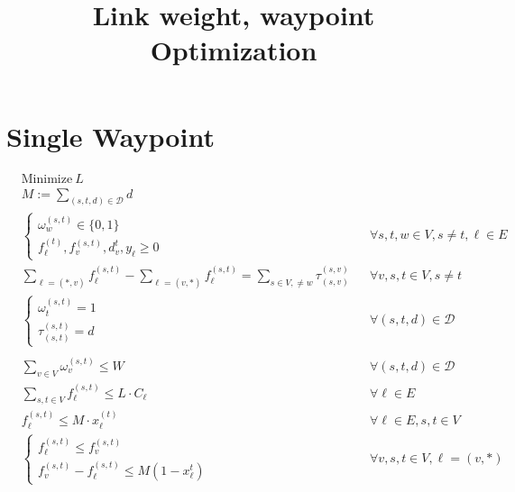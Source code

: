\documentclass[a4paper,USenglish]{lipics-v2018}
\title{Link weight, waypoint Optimization}
\begin{document}
\maketitle

\section{Single Waypoint}

\begin{align}
& \text{Minimize} ~L \nonumber	&&\\
&M := \sum_{ (s,t,d) \in \mathcal{D}} d &&
\\
&\begin{cases}
\omega^{(s,t)}_{w} \in \{0,1\} \\
f^{(t)}_{\ell}, f^{(s,t)}_{v}, d^{t}_v, y_{\ell}  \geq 0
\end{cases}
&&\forall  s,t,w \in V, s \neq t, \ell \in E \label{LP:vardef}    
\\
&\sum_{\ell = (*,v)} f^{(s,t)}_{\ell} - 
	\sum_{\ell= (v,*)}f^{(s,t)}_{\ell}
	= \sum_{ s\in V,\neq w} \tau^{(s,v)}_{(s,v)}
&& \forall v,s,t \in V, s \neq t
\label{LP:flowcons}
\\
& 
\begin{cases}
\omega^{(s,t)}_{t} = 1 \\
\tau^{(s,t)}_{(s,t)} = d
\end{cases}
&& \forall (s,t,d) \in \mathcal{D}
\label{LP:wp_t}
\\
&
\\
&\sum_{v \in V}  \omega^{(s,t)}_v \leq W
&& \forall (s,t,d) \in \mathcal{D}
\label{LP:wp_limit} 
\\
& \sum_{ s,t \in V} f^{(s,t)}_{\ell} \leq L \cdot C_{\ell}
&& \forall \ell \in E
\\
&   f^{(s,t)}_{\ell} \leq M \cdot x^{(t)}_{\ell}
&& \forall \ell \in E, s,t \in V
\label{LP:SPTree} 
\\
&
\begin{cases*}
f^{(s,t)}_{\ell} \leq f^{(s,t)}_{v}	\\
f^{(s,t)}_{v} - f^{(s,t)}_{\ell} \leq M(1 - x^{t}_{\ell}) 
\end{cases*}	
&& \forall v,s,t \in V, \ell = (v,*)
\label{LP:equalSplit} 

\end{align}
\end{document}
